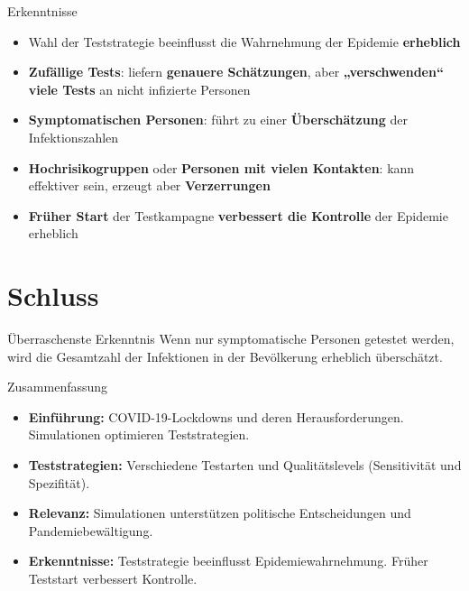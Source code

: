\documentclass[ngerman,14pt,aspectratio=1610]{beamer}
\def\secname{Gliederung} %
\let\oldsection\section
\renewcommand{\section}[1]{
	\oldsection{#1}
	\newtotcounter{#1}
	\def\secname{#1}
}
\newcommand{\source}{}
\begin{document}
	\renewcommand{\source}{Quelle: \url{https://arxiv.org/pdf/2210.13089}}
	
	\begin{frame}[t]{Erkenntnisse}
		\begin{itemize}
			\item Wahl der Teststrategie beeinflusst die Wahrnehmung der Epidemie \textbf{erheblich}
			\item \textbf{\alert{Zufällige Tests}}: liefern \textbf{genauere Schätzungen}, aber \textbf{„verschwenden“ viele Tests} an nicht infizierte Personen
			\item \textbf{\alert{Symptomatischen Personen}}: führt zu einer \textbf{Überschätzung} der Infektionszahlen
			\item \textbf{\alert{Hochrisikogruppen}} oder \textbf{\alert{Personen mit vielen Kontakten}}: kann effektiver sein, erzeugt aber \textbf{Verzerrungen}
			\item \textbf{Früher Start} der Testkampagne \textbf{verbessert die Kontrolle} der Epidemie erheblich
		\end{itemize}
	\end{frame}
	
	\section{Schluss}
		\renewcommand{\source}{ }
	
		\begin{frame}[t]{Überraschenste Erkenntnis} \vspace{80pt}
			 Wenn nur symptomatische Personen getestet werden, wird die Gesamtzahl der Infektionen in der Bevölkerung erheblich überschätzt.
		\end{frame}
		
		\begin{frame}[t]{Zusammenfassung} \vspace{15pt}
			\begin{itemize}
				\item \textbf{Einführung:} COVID-19-Lockdowns und deren Herausforderungen. Simulationen optimieren Teststrategien.
				\item \textbf{Teststrategien:} Verschiedene Testarten und Qualitätslevels (Sensitivität und Spezifität).
				\item \textbf{Relevanz:} Simulationen unterstützen politische Entscheidungen und Pandemiebewältigung.
				\item \textbf{Erkenntnisse:} Teststrategie beeinflusst Epidemiewahrnehmung. Früher Teststart verbessert Kontrolle.
			\end{itemize}
		\end{frame}
	
\end{document}
